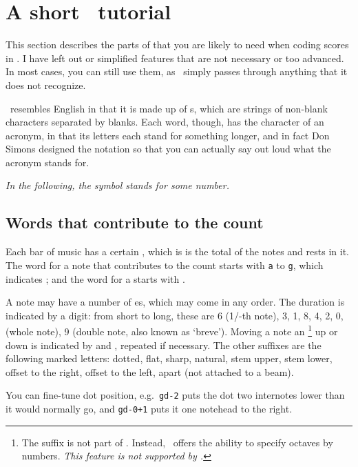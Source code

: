 \documentclass[11pt]{article}
\begin{document}
\section{A short \PMX\ tutorial}  \label{pmx}

  This section describes the parts of  that you are likely to need 
when coding scores in \MTx.  I have left out or simplified features 
that are not 
necessary or too advanced.  In most cases, you can still use them, as 
\MTx\ simply passes through anything that it does not recognize.  

  \PMX\ resembles English in that it is made up of s, which are 
strings of non-blank characters separated by blanks.  Each word, though, 
has the character of an acronym, in that its letters each stand for 
something longer, and in fact Don Simons designed the notation so that 
you can actually say out loud what the acronym stands for.

  \textsl{In the following, the symbol \ttxem{\#} stands for some number.}

 \subsection{Words that contribute to the count}

  Each bar of music has a certain , which is is the total of the 
notes and rests in it.  The word for a note that contributes to the 
count starts with \texttt{a} to \texttt{g}, which indicates ; and 
the word for a  starts with .  

  A note may have a number of es, which may come in any order.  
The duration is indicated by a digit: from short to long, these are
6 (1/-th note), 3, 1, 8, 4, 2, 0, (whole note), 9 (double note, 
also known as `breve').   
Moving a 
note an \footnote{The \ttxem{=} suffix is not part of \PMX.
Instead, \PMX\ offers the ability to specify octaves by numbers. \emph{This
feature is not supported by \MTx.}}
 up or down is indicated by \ttxem{+} and \ttxem{-},
repeated if necessary.
The other suffixes are the following marked letters: \mark dotted,
\mark flat, \mark sharp, \mark natural, stem \mark upper, 
stem \mark lower, offset to the \mark right, offset to the 
l\mark eft, \mark apart (not attached to a beam).

You can fine-tune  dot position, e.g.\
\verb"gd-2" puts the dot two internotes lower than it would normally go, 
and \verb"gd-0+1" puts it one notehead to the right.  
\end{document}
